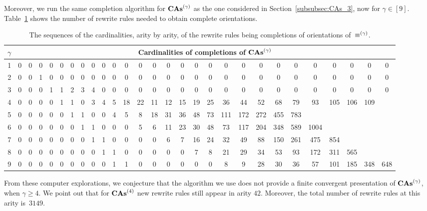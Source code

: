 Moreover, we run the same completion algorithm for $\mathbf{CAs}^{\left(\gamma\right)}$ as
the one considered in Section~\ref{subsubsec:CAs_3}, now for
$\gamma \in [9]$. Table~\ref{tab:cardinalities_completion_CAs} shows
the number of rewrite rules needed to obtain complete orientations.
\begin{table}[ht]
    \centering
    \footnotesize
    \setlength{\tabcolsep}{.35em}
    \begin{tabular}{c||ccccccccccccccccccccccccccc}
        $\gamma$ & \multicolumn{27}{c}{
        Cardinalities of completions of $\mathbf{CAs}^{\left(\gamma\right)}$}
        \\ \hline \hline
        1 & 0 & 0 & 0 & 0 & 0 & 0 & 0 & 0 & 0 & 0 & 0 & 0 & 0 & 0 & 0
        & 0 & 0 & 0 & 0 & 0 & 0 & 0 & 0 & 0 & 0 & 0 & 0
        \\
        2 & 0 & 0 & 1 & 0 & 0 & 0 & 0 & 0 & 0 & 0 & 0 & 0 & 0 & 0 & 0
        & 0 & 0 & 0 & 0 & 0 & 0 & 0 & 0 & 0 & 0 & 0 & 0
        \\
        3 & 0 & 0 & 0 & 1 & 1 & 2 & 3 & 4 & 0 & 0 & 0 & 0 & 0 & 0 & 0
        & 0 & 0 & 0 & 0 & 0 & 0 & 0 & 0 & 0 & 0 & 0 & 0
        \\
        4 & 0 & 0 & 0 & 0 & 1 & 1 & 0 & 3 & 4 & 5 & 18 & 22 & 11 & 12
        & 15 & 19 & 25 & 36 & 44 & 52 & 68 & 79 & 93 & 105 & 106 & 109
        \\
        5 & 0 & 0 & 0 & 0 & 0 & 1 & 1 & 0 & 0 & 4 & 5 & 8 & 18 & 31
        & 36 & 48 & 73 & 111 & 172 & 272 & 455 & 783
        \\
        6 & 0 & 0 & 0 & 0 & 0 & 0 & 1 & 1 & 0 & 0 & 0 & 5 & 6 & 11
        & 23 & 30 & 48 & 73 & 117 & 204 & 348 & 589 & 1004
        \\
        7 & 0 & 0 & 0 & 0 & 0 & 0 & 0 & 1 & 1 & 0 & 0 & 0 & 0 & 6 & 7
        & 16 & 24 & 32 & 49 & 88 & 150 & 261 & 475 & 854
        \\
        8 & 0 & 0 & 0 & 0 & 0 & 0 & 0 & 0 & 1 & 1 & 0 & 0 & 0 & 0 & 0
        & 7 & 8 & 21 & 29 & 34 & 53 & 93 & 172 & 311 & 565
        \\
        9 & 0 & 0 & 0 & 0 & 0 & 0 & 0 & 0 & 0 & 1 & 1 & 0 & 0 & 0 & 0
        & 0 & 0 & 8 & 9 & 28 & 30 & 36 & 57 & 101 & 185 & 348 & 648
    \end{tabular}
    \medbreak

    \caption{\footnotesize
    The sequences of the cardinalities, arity by arity, of the rewrite
    rules being completions of orientations of~$\operatorname{\equiv}^{\left(\gamma\right)}$.}
    \label{tab:cardinalities_completion_CAs}
\end{table}
From these computer explorations, we conjecture that the algorithm we
use does not provide a finite convergent presentation of $\mathbf{CAs}^{\left(\gamma\right)}$,
when $\gamma \geq 4$. We point out that for $\mathbf{CAs}^{\left(4\right)}$ new rewrite
rules still appear in arity $42$. Moreover, the total number of rewrite
rules at this arity is~$3149$.
\medbreak

